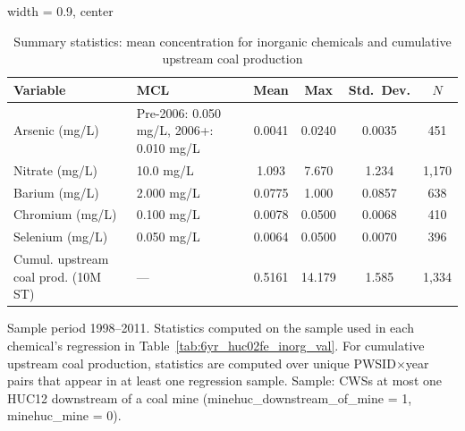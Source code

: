 
\begin{table}[htbp]
   \caption{\label{tab:6yr_huc02fe_inorg_val_sumstats} Summary statistics: mean concentration for inorganic chemicals and cumulative upstream coal production}
   \bigskip
   \centering
   \begin{adjustbox}{width = 0.9\textwidth, center}
      \begin{tabular}{lp{3.8cm}cccc}
         \toprule
         Variable & MCL & Mean & Max & Std.\ Dev. & $N$ \\
         \midrule
         Arsenic (mg/L) & Pre-2006: 0.050 mg/L, 2006+: 0.010 mg/L & 0.0041 & 0.0240 & 0.0035 & 451 \\
         Nitrate (mg/L) & 10.0 mg/L & 1.093 & 7.670 & 1.234 & 1,170 \\
         Barium (mg/L) & 2.000 mg/L & 0.0775 & 1.000 & 0.0857 & 638 \\
         Chromium (mg/L) & 0.100 mg/L & 0.0078 & 0.0500 & 0.0068 & 410 \\
         Selenium (mg/L) & 0.050 mg/L & 0.0064 & 0.0500 & 0.0070 & 396 \\
         Cumul. upstream coal prod. (10M ST) & --- & 0.5161 & 14.179 & 1.585 & 1,334 \\
         \bottomrule
      \end{tabular}
   \end{adjustbox}
   {\tiny\linespread{1}\selectfont \par \raggedright Sample period 1998--2011. Statistics computed on the sample used in each chemical's regression in Table~\ref{tab:6yr_huc02fe_inorg_val}. For cumulative upstream coal production, statistics are computed over unique PWSID$\times$year pairs that appear in at least one regression sample. Sample: CWSs at most one HUC12 downstream of a coal mine (minehuc\_downstream\_of\_mine = 1, minehuc\_mine = 0).}
\end{table}

